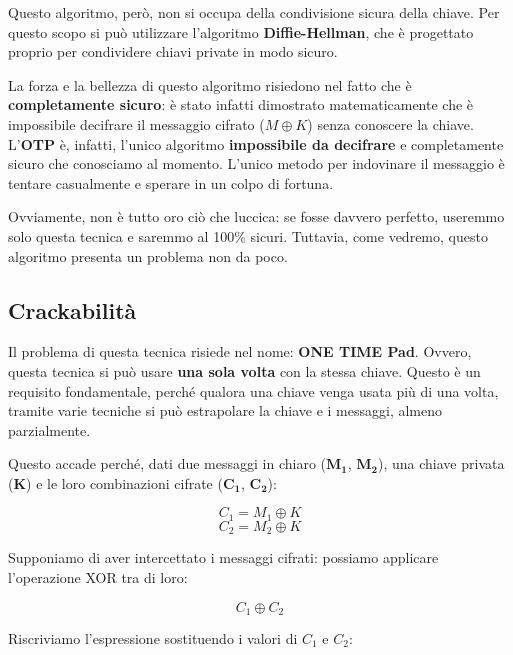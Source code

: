 \documentclass{report}
\begin{document}
Questo algoritmo, però, non si occupa della condivisione sicura della chiave. Per questo scopo si può utilizzare l'algoritmo \textbf{Diffie-Hellman}, che è progettato proprio per condividere chiavi private in modo sicuro.  

La forza e la bellezza di questo algoritmo risiedono nel fatto che è \textbf{completamente sicuro}: è stato infatti dimostrato matematicamente che è impossibile decifrare il messaggio cifrato (\(M \oplus K\)) senza conoscere la chiave. L'\textbf{OTP} è, infatti, l'unico algoritmo \textbf{impossibile da decifrare} e completamente sicuro che conosciamo al momento. L'unico metodo per indovinare il messaggio è tentare casualmente e sperare in un colpo di fortuna.  

Ovviamente, non è tutto oro ciò che luccica: se fosse davvero perfetto, useremmo solo questa tecnica e saremmo al 100\% sicuri. Tuttavia, come vedremo, questo algoritmo presenta un problema non da poco.  




\subsection{Crackabilità}
Il problema di questa tecnica risiede nel nome: \textbf{ONE TIME Pad}. Ovvero, questa tecnica si può usare \textbf{una sola volta} con la stessa chiave. Questo è un requisito fondamentale, perché qualora una chiave venga usata più di una volta, tramite varie tecniche si può estrapolare la chiave e i messaggi, almeno parzialmente.  

Questo accade perché, dati due messaggi in chiaro (\(\mathbf{M_1}\), \(\mathbf{M_2}\)), una chiave privata (\(\mathbf{K}\)) e le loro combinazioni cifrate (\(\mathbf{C_1}\), \(\mathbf{C_2}\)):  

\begin{equation*}
    C_1 = M_1 \oplus K 
\end{equation*}
\begin{equation*}
    C_2 = M_2 \oplus K    
\end{equation*}

Supponiamo di aver intercettato i messaggi cifrati: possiamo applicare l'operazione XOR tra di loro:  

\begin{equation*}
    C_1 \oplus C_2
\end{equation*}

Riscriviamo l'espressione sostituendo i valori di \(C_1\) e \(C_2\):  
\end{document}
